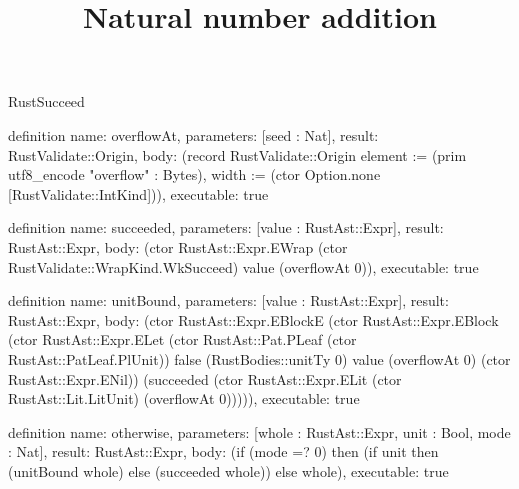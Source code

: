 \begin{lexlean}{RustSucceed}
\title{Natural number addition}
\begin{semanticmodule}
definition{
  name: overflowAt,
  parameters: [seed : Nat],
  result: RustValidate::Origin,
  body: (record RustValidate::Origin {element := (prim utf8_encode "overflow" : Bytes), width := (ctor Option.none [RustValidate::IntKind])}),
  executable: true
}

definition{
  name: succeeded,
  parameters: [value : RustAst::Expr],
  result: RustAst::Expr,
  body: (ctor RustAst::Expr.EWrap (ctor RustValidate::WrapKind.WkSucceed) value (overflowAt 0)),
  executable: true
}

definition{
  name: unitBound,
  parameters: [value : RustAst::Expr],
  result: RustAst::Expr,
  body: (ctor RustAst::Expr.EBlockE (ctor RustAst::Expr.EBlock (ctor RustAst::Expr.ELet (ctor RustAst::Pat.PLeaf (ctor RustAst::PatLeaf.PlUnit)) false (RustBodies::unitTy 0) value (overflowAt 0) (ctor RustAst::Expr.ENil)) (succeeded (ctor RustAst::Expr.ELit (ctor RustAst::Lit.LitUnit) (overflowAt 0))))),
  executable: true
}

definition{
  name: otherwise,
  parameters: [whole : RustAst::Expr, unit : Bool, mode : Nat],
  result: RustAst::Expr,
  body: (if (mode =? 0) then (if unit then (unitBound whole) else (succeeded whole)) else whole),
  executable: true
}


\end{semanticmodule}
\end{lexlean}
